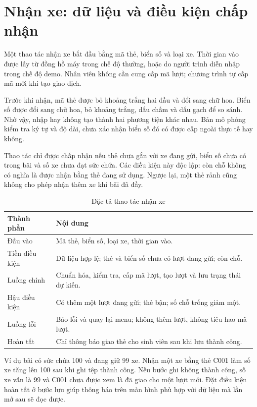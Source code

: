 \section{Nhận xe: dữ liệu và điều kiện chấp nhận}
Một thao tác nhận xe bắt đầu bằng mã thẻ, biển số và loại xe. Thời gian vào được lấy từ đồng hồ máy trong chế độ thường, hoặc do người trình diễn nhập trong chế độ demo. Nhân viên không cần cung cấp mã lượt; chương trình tự cấp mã mới khi tạo giao dịch.

Trước khi nhận, mã thẻ được bỏ khoảng trắng hai đầu và đổi sang chữ hoa. Biển số được đổi sang chữ hoa, bỏ khoảng trắng, dấu chấm và dấu gạch để so sánh. Nhờ vậy, nhập  hay  không tạo thành hai phương tiện khác nhau. Bản mô phỏng kiểm tra ký tự và độ dài, chưa xác nhận biển số đó có được cấp ngoài thực tế hay không.

Thao tác chỉ được chấp nhận nếu thẻ chưa gắn với xe đang gửi, biển số chưa có trong bãi và số xe chưa đạt sức chứa. Các điều kiện này độc lập: còn chỗ không có nghĩa là được nhận bằng thẻ đang sử dụng. Ngược lại, một thẻ rảnh cũng không cho phép nhận thêm xe khi bãi đã đầy.

\begin{table}[H]
\centering\small
\caption{Đặc tả thao tác nhận xe}
\label{tab:checkin-spec}
\begin{tabularx}{\textwidth}{l Y}
\toprule
Thành phần & Nội dung\\
\midrule
Đầu vào & Mã thẻ, biển số, loại xe, thời gian vào.\\
Tiền điều kiện & Dữ liệu hợp lệ; thẻ và biển số chưa có lượt đang gửi; còn chỗ.\\
Luồng chính & Chuẩn hóa, kiểm tra, cấp mã lượt, tạo lượt và lưu trạng thái dự kiến.\\
Hậu điều kiện & Có thêm một lượt đang gửi; thẻ bận; số chỗ trống giảm một.\\
Luồng lỗi & Báo lỗi và quay lại menu; không thêm lượt, không tiêu hao mã lượt.\\
Hoàn tất & Chỉ thông báo giao thẻ cho sinh viên sau khi lưu thành công.\\
\bottomrule
\end{tabularx}
\end{table}

Ví dụ bãi có sức chứa 100 và đang giữ 99 xe. Nhận một xe bằng thẻ C001 làm số xe tăng lên 100 sau khi ghi tệp thành công. Nếu bước ghi không thành công, số xe vẫn là 99 và C001 chưa được xem là đã giao cho một lượt mới. Đặt điều kiện hoàn tất ở bước lưu giúp thông báo trên màn hình phù hợp với dữ liệu mà lần mở sau sẽ đọc được.

